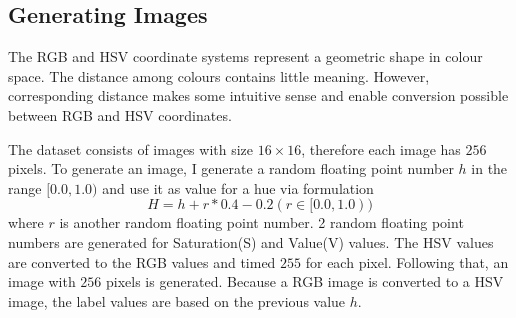 \subsection{Generating Images}

The RGB and HSV coordinate systems represent a geometric shape in colour space. The distance among colours contains little meaning. However, corresponding distance makes some intuitive sense and enable conversion possible between RGB and HSV coordinates.

The dataset consists of images with size $16\times16$, therefore each image has $256$ pixels. To generate an image, I generate a random floating point number $h$ in the range $[0.0, 1.0)$ and use it as value for a hue via formulation
\begin{equation}\label{eq:FormulationHue}
H = h + r * 0.4 - 0.2 (r \in [0.0,1.0))
\end{equation}
where $r$ is another random floating point number. 2 random floating point numbers are generated for Saturation(S) and Value(V) values. The HSV values are converted to the RGB values and timed $255$ for each pixel. Following that, an image with $256$ pixels is generated. Because a RGB image is converted to a HSV image, the label values are based on the previous value $h$.

